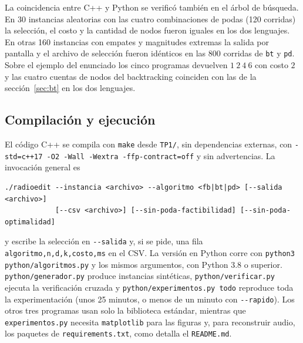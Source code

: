 La coincidencia entre C++ y Python se verificó también en el árbol de búsqueda. En 30 instancias aleatorias con las cuatro combinaciones de podas (120 corridas) la selección, el costo y la cantidad de nodos fueron iguales en los dos lenguajes. En otras 160 instancias con empates y magnitudes extremas la salida por pantalla y el archivo de selección fueron idénticos en las 800 corridas de \texttt{bt} y \texttt{pd}. Sobre el ejemplo del enunciado los cinco programas devuelven $1\ 2\ 4\ 6$ con costo $2$ y las cuatro cuentas de nodos del backtracking coinciden con las de la sección~\ref{sec:bt} en los dos lenguajes.

\subsection{Compilación y ejecución}\label{sec:compilacion}

El código C++ se compila con \texttt{make} desde \texttt{TP1/}, sin dependencias externas, con \texttt{-std=c++17 -O2 -Wall -Wextra -ffp-contract=off} y sin advertencias. La invocación general es
\begin{verbatim}
./radioedit --instancia <archivo> --algoritmo <fb|bt|pd> [--salida <archivo>]
            [--csv <archivo>] [--sin-poda-factibilidad] [--sin-poda-optimalidad]
\end{verbatim}
\begin{sloppypar}
y escribe la selección en \texttt{-{}-salida} y, si se pide, una fila \texttt{algoritmo,n,d,k,costo,ms} en el CSV. La versión en Python corre con \texttt{python3 python/algoritmos.py} y los mismos argumentos, con Python 3.8 o superior. \texttt{python/generador.py} produce instancias sintéticas, \texttt{python/verificar.py} ejecuta la verificación cruzada y \texttt{python/experimentos.py todo} reproduce toda la experimentación (unos 25 minutos, o menos de un minuto con \texttt{-{}-rapido}). Los otros tres programas usan solo la biblioteca estándar, mientras que \texttt{experimentos.py} necesita \texttt{matplotlib} para las figuras y, para reconstruir audio, los paquetes de \texttt{requirements.txt}, como detalla el \texttt{README.md}.
\end{sloppypar}
